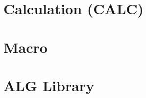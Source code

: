 \section{Calculation (CALC)}\label{d:sec:calc}

\section{Macro}

\section{ALG Library}\label{d:sec:alg_lib}
